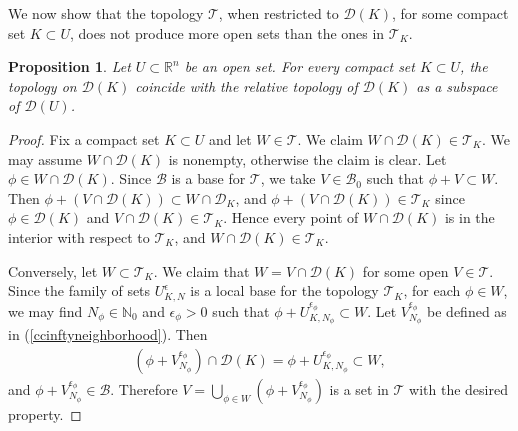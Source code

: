 \documentclass{article}
\numberwithin{equation}{section}
\newcommand{\bbN}{\mathbb{N}}
\newcommand{\bbR}{\mathbb{R}}
\newcommand{\scr}{\mathscr}
\renewcommand{\cal}{\mathcal}
\theoremstyle{plain}
\newtheorem{proposition}[theorem]{Proposition}
\theoremstyle{definition}
\begin{document}
We now show that the topology $\scr{T}$, when restricted to $\cal{D}(K)$, for some compact set $K\subset U$, does not produce more open sets than the ones in $\mathscr{T}_K$.
\begin{proposition}\label{subktop}
Let $U\subset\bbR^n$ be an open set. For every compact set $K\subset U$, the topology on $\cal{D}(K)$ coincide with the relative topology of $\cal{D}(K)$ as a subspace of $\cal{D}(U)$.
\end{proposition}
\begin{proof}
Fix a compact set $K\subset U$ and let $W\in\mathscr{T}$. We claim $W\cap\cal{D}(K)\in\mathscr{T}_K$. We may assume $W\cap\cal{D}(K)$ is nonempty, otherwise the claim is clear. Let $\phi\in W\cap\cal{D}(K)$. Since $\mathscr{B}$ is a base for $\mathscr{T}$, we take $V\in\scr{B}_0$ such that $\phi+V\subset W$. Then $\phi+(V\cap\cal{D}(K))\subset W\cap\cal{D}_K$, and $\phi+(V\cap\cal{D}(K))\in\mathscr{T}_K$ since $\phi\in\cal{D}(K)$ and $V\cap\cal{D}(K)\in\mathscr{T}_K$. Hence every point of $W\cap\cal{D}(K)$ is in the interior with respect to $\scr{T}_K$, and $W\cap\cal{D}(K)\in\scr{T}_K$.

Conversely, let $W\subset\mathscr{T}_K$. We claim that $W=V\cap\cal{D}(K)$ for some open $V\in\scr{T}$. Since the family of sets $U_{K,N}^\epsilon$ is a local base for the topology $\mathscr{T}_K$, for each $\phi\in W$, we may find $N_\phi\in\bbN_0$ and $\epsilon_\phi>0$ such that $\phi+U_{K,N_\phi}^{\epsilon_\phi}\subset W$. Let $V_{N_\phi}^{\epsilon_\phi}$ be defined as in (\ref{ccinftyneighborhood}). Then
\begin{align*}
	(\phi+V_{N_\phi}^{\epsilon_\phi})\cap\cal{D}(K)=\phi+U_{K,N_\phi}^{\epsilon_\phi}\subset W,
\end{align*}
and $\phi+V_{N_\phi}^{\epsilon_\phi}\in\scr{B}$. Therefore $V=\bigcup_{\phi\in W}(\phi+V_{N_\phi}^{\epsilon_\phi})$ is a set in $\scr{T}$ with the desired property.
\end{proof}
\end{document}
